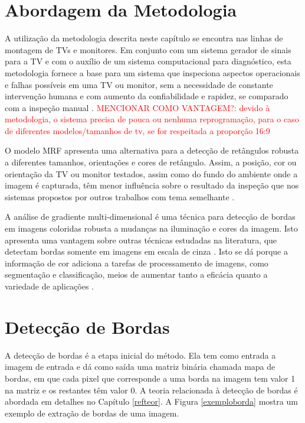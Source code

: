 \section{Abordagem da Metodologia} \label{met:abord}

A utilização da metodologia descrita neste capítulo se encontra nas linhas de montagem de TVs e monitores. Em conjunto com um sistema gerador de sinais para a TV e com o auxílio de um sistema computacional para diagnóstico, esta metodologia fornece a base para um sistema que inspeciona aspectos operacionais e falhas possíveis em uma TV ou monitor, sem a necessidade de constante intervenção humana e com aumento da confiabilidade e rapidez, se comparado com a inspeção manual \cite{vantagemauto}. \textcolor{red}{MENCIONAR COMO VANTAGEM?: devido à metodologia, o sistema precisa de pouca ou nenhuma reprogramação, para o caso de diferentes modelos/tamanhos de tv, se for respeitada a proporção 16:9}

O modelo MRF apresenta uma alternativa para a detecção de retângulos robusta a diferentes tamanhos, orientações e cores de retângulo. Assim, a posição, cor ou orientação da TV ou monitor testados, assim como do fundo do ambiente onde a imagem é capturada, têm menor influência sobre o resultado da inspeção que nos sistemas propostos por outros trabalhos com tema semelhante \cite{inspect,vantagemauto}.

A análise de gradiente multi-dimensional é uma técnica para detecção de bordas em imagens coloridas robusta a mudanças na iluminação e cores da imagem. Isto apresenta uma vantagem sobre outras técnicas estudadas na literatura, que detectam bordas somente em imagens em escala de cinza \cite{canny,citasobel,roberts}. Isto se dá porque a informação de cor adiciona a tarefas de processamento de imagens, como segmentação e classificação, meios de aumentar tanto a eficácia quanto a variedade de aplicações \cite{bordacolor}.

\section{Detecção de Bordas} \label{met:borda}


A detecção de bordas é a etapa inicial do método. Ela tem como entrada a imagem de entrada e dá como saída uma matriz binária chamada mapa de bordas, em que cada pixel que corresponde a uma borda na imagem tem valor 1 na matriz e os restantes têm valor 0. A teoria relacionada à detecção de bordas é abordada em detalhes no Capítulo \ref{refteor}. A Figura \ref{exemploborda} mostra um exemplo de extração de bordas de uma imagem.

